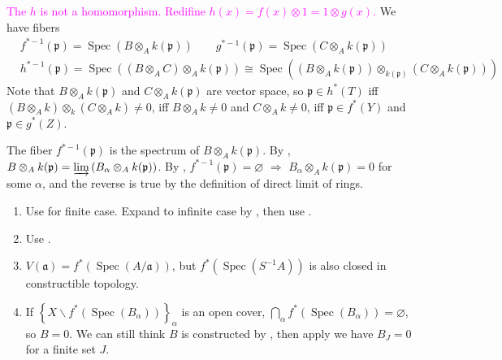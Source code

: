 \begin{exercise}\label{ex3.25}
	\textcolor{magenta}{The $h$ is not a homomorphism. Redifine $h(x)=f(x)\otimes1=1\otimes g(x)$.} We have fibers 
	\begin{align*}
		&f^{*-1}(\mathfrak{p})=\operatorname{Spec}\left(B\otimes_Ak(\mathfrak{p})\right)\qquad g^{*-1}(\mathfrak{p})=\operatorname{Spec}\left(C\otimes_Ak(\mathfrak{p})\right)\\
		&h^{*-1}(\mathfrak{p})=\operatorname{Spec}\left(\left(B\otimes_AC\right)\otimes_Ak(\mathfrak{p})\right)\cong\operatorname{Spec}\left(\left(B\otimes_Ak(\mathfrak{p})\right)\otimes_{k(\mathfrak{p})}\left(C\otimes_Ak(\mathfrak{p})\right)\right)
	\end{align*}
	Note that $B\otimes_Ak(\mathfrak{p})$ and $C\otimes_Ak(\mathfrak{p})$ are vector space, so $\mathfrak{p}\in h^*(T)$ iff $\left(B\otimes_Ak\right)\otimes_k\left(C\otimes_Ak\right)\neq0$, iff $B\otimes_Ak\neq0$ and $C\otimes_Ak\neq0$, iff $\mathfrak{p}\in f^*(Y)$ and $\mathfrak{p}\in g^*(Z)$.
\end{exercise}

\begin{exercise}\label{ex3.26}
	The fiber $f^{*-1}(\mathfrak{p})$ is the spectrum of $B\otimes_Ak(\mathfrak{p})$. By , $B\otimes_Ak(\mathfrak{p})=\varinjlim\left(B_\alpha\otimes_Ak(\mathfrak{p})\right)$. By , $f^{*-1}(\mathfrak{p})=\varnothing$ $\Rightarrow$ $B_\alpha\otimes_Ak(\mathfrak{p})=0$ for some $\alpha$, and the reverse is true by the definition of direct limit of rings.
\end{exercise}

\begin{exercise}\label{ex3.27}
	\begin{enumerate}[label=\textup{(\roman*)},ref=\theexercise(\roman*)]
		\item Use  for finite case. Expand to infinite case by , then use .
		\item Use .
		\item $V(\mathfrak{a})=f^*\left(\operatorname{Spec}(A/\mathfrak{a})\right)$, but $f^*\left(\operatorname{Spec}\left(S^{-1}A\right)\right)$ is also closed in constructible topology.
		\item If $\left\{X\backslash f^*\left(\operatorname{Spec}\left(B_\alpha\right)\right)\right\}_\alpha$ is an open cover, $\bigcap_\alpha f^*\left(\operatorname{Spec}\left(B_\alpha\right)\right)=\varnothing$, so $B=0$. We can still think $B$ is constructed by , then apply  we have $B_J=0$ for a finite set $J$.
	\end{enumerate}
\end{exercise}

